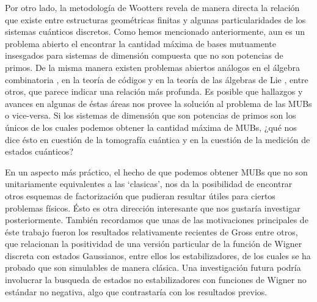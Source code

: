 \documentclass[a4paper]{report}
\begin{document}
  Por otro lado, la metodología de Wootters revela de manera
  directa la relación que existe entre estructuras
  geométricas finitas y algunas particularidades de los
  sistemas cuánticos discretos. Como hemos mencionado
  anteriormente, aun es un problema abierto el encontrar la
  cantidad máxima de bases mutuamente insesgados para
  sistemas de dimensión compuesta que no son potencias de
  primos. De la misma manera existen problemas abiertos
  análogos en el álgebra combinatoria \cite{kantor2003}, en
  la teoría de códigos \cite{kantor1982} y en la teoría de
  las álgebras de Lie \cite{ivanov1987, kantor1996,
  boykin2005}, entre otros, que parece indicar una relación
  más profunda. Es posible que hallazgos y avances en
  algunas de éstas áreas nos provee la solución al problema
  de las MUBs o vice-versa. Si los sistemas de dimensión que
  son potencias de primos son los únicos de los cuales
  podemos obtener la cantidad máxima de MUBs, ¿qué nos dice
  ésto en cuestión de la tomografía cuántica y en la
  cuestión de la medición de estados cuánticos?

  En un aspecto más práctico, el hecho de que podemos
  obtener MUBs que no son unitariamente equivalentes a las
  `clasicas', nos da la posibilidad de encontrar otros
  esquemas de factorización que pudieran resultar útiles
  para ciertos problemas físicos. Ésto es otra dirección
  interesante que nos gustaría investigar posteriormente.
  También recordamos que unas de las motivaciones
  principales de éste trabajo fueron los resultados
  relativamente recientes de Gross \cite{gross2006} entre
  otros, que relacionan la positividad de una versión
  particular de la función de Wigner discreta con estados
  Gaussianos, entre ellos los estabilizadores, de los cuales
  se ha probado que son simulables de manera clásica. Una
  investigación futura podría involucrar la busqueda de
  estados no estabilizadores con funciones de Wigner no
  estándar no negativa, algo que contrastaría con los
  resultados previos.

  \newpage
  \appendix
  

  \newpage
  \printbibliography
\end{document}
